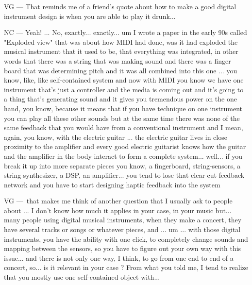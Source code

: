 VG — That reminds me of a friend's quote about how to make a good digital instrument design is when you are able to play it drunk... 

NC — Yeah! ... No, exactly... exactly... um I wrote a paper in the early 90s called "Exploded view" that was about how MIDI had done, was it had exploded the musical instrument that it used to be, that everything was integrated, in other words that there was a string that was making sound and there was a finger board that was determining pitch and it was all combined into this one ... you know, like, like self-contained system and now with MIDI you know we have one instrument that's just a controller and the media is coming out and it's going to a thing that's generating sound and it gives you tremendous power on the one hand, you know,  because it means that if you have technique on one instrument you can play all these other sounds but at the same time there was none of the same feedback that you would have from a conventional instrument and I mean, again, you know, with the electric guitar ... the electric guitar lives in close proximity to the amplifier and every good electric guitarist knows how the guitar and the amplifier in the body interact to form a complete system... well... if you break it up into more separate pieces you know, a fingerboard, string-sensors, a string-synthesizer, a DSP, an amplifier... you tend to lose that clear-cut  feedback network and you have to start designing haptic feedback  into the system 

VG — that makes me think of another question that I usually ask to people about ... I don't know how much it applies in your case, in your music but... many people using digital musical instruments, when they make a concert, they have several tracks or songs or whatever pieces, and ... um ... with those digital instruments, you have the ability with one click, to completely change sounds and mapping between the sensors, so you have to figure out your own way with this issue... and there is not only one way, I think, to go from one end to end of a concert, so... is it relevant in your case ? From what you told me, I tend to realize that you mostly use one self-contained object with... 

